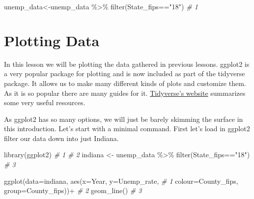\documentclass[
]{book}
\newenvironment{Shaded}{\begin{snugshade}}{\end{snugshade}}
\newcommand{\AttributeTok}[1]{\textcolor[rgb]{0.77,0.63,0.00}{#1}}
\newcommand{\CommentTok}[1]{\textcolor[rgb]{0.56,0.35,0.01}{\textit{#1}}}
\newcommand{\FunctionTok}[1]{\textcolor[rgb]{0.00,0.00,0.00}{#1}}
\newcommand{\NormalTok}[1]{#1}
\newcommand{\OtherTok}[1]{\textcolor[rgb]{0.56,0.35,0.01}{#1}}
\newcommand{\SpecialCharTok}[1]{\textcolor[rgb]{0.00,0.00,0.00}{#1}}
\newcommand{\StringTok}[1]{\textcolor[rgb]{0.31,0.60,0.02}{#1}}
\begin{document}
\begin{Shaded}
\begin{Highlighting}[]
\NormalTok{unemp\_data}\OtherTok{\textless{}{-}}\NormalTok{unemp\_data }\SpecialCharTok{\%\textgreater{}\%} \FunctionTok{filter}\NormalTok{(State\_fips}\SpecialCharTok{==}\StringTok{"18"}\NormalTok{)  }\CommentTok{\# 1}
\end{Highlighting}
\end{Shaded}

\hypertarget{plotting-data}{%
\section{Plotting Data}\label{plotting-data}}

In this lesson we will be plotting the data gathered in previous lessons. ggplot2 is a very popular package for plotting and is now included as part of the tidyverse package. It allows us to make many different kinds of plots and customize them. As it is so popular there are many guides for it. \href{https://ggplot2.tidyverse.org/}{Tidyverse's website} summarizes some very useful resources.

As ggplot2 has so many options, we will just be barely skimming the surface in this introduction. Let's start with a minimal command. First let's load in ggplot2 filter our data down into just Indiana.

\begin{Shaded}
\begin{Highlighting}[]
\FunctionTok{library}\NormalTok{(ggplot2)                                    }\CommentTok{\# 1}
                                                    \CommentTok{\# 2}
\NormalTok{indiana }\OtherTok{\textless{}{-}}\NormalTok{ unemp\_data }\SpecialCharTok{\%\textgreater{}\%} \FunctionTok{filter}\NormalTok{(State\_fips}\SpecialCharTok{==}\StringTok{"18"}\NormalTok{)  }\CommentTok{\# 3}
\end{Highlighting}
\end{Shaded}

\begin{Shaded}
\begin{Highlighting}[]
\FunctionTok{ggplot}\NormalTok{(}\AttributeTok{data=}\NormalTok{indiana, }\FunctionTok{aes}\NormalTok{(}\AttributeTok{x=}\NormalTok{Year, }\AttributeTok{y=}\NormalTok{Unemp\_rate,   }\CommentTok{\# 1}
    \AttributeTok{colour=}\NormalTok{County\_fips, }\AttributeTok{group=}\NormalTok{County\_fips))}\SpecialCharTok{+}     \CommentTok{\# 2}
  \FunctionTok{geom\_line}\NormalTok{()                                    }\CommentTok{\# 3}
\end{Highlighting}
\end{Shaded}
\end{document}

